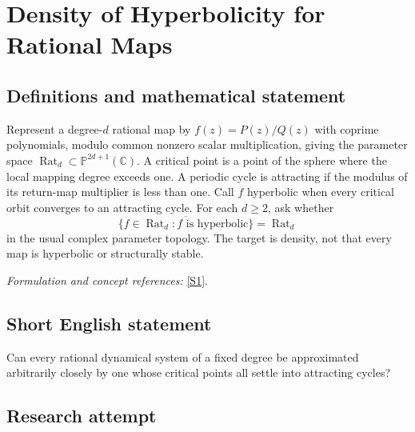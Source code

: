 \documentclass[11pt,a4paper]{article}
\newcommand{\C}{\mathbb{C}}
\newcommand{\PP}{\mathbb P}
\newcommand{\sref}[2]{\hyperlink{source:#1:#2}{[S#2]}}
\newif\ifshowcatalogue
\newcommand{\cataloguescope}[1]{\ifshowcatalogue
 \paragraph{Exact scope in the supplied catalogue.}
 \begin{quote}\small #1\end{quote}\fi}
\numberwithin{equation}{section}
\begin{document}
\setcounter{section}{0}
\clearpage
\section*{\texorpdfstring{Density of Hyperbolicity for Rational Maps}{Density of Hyperbolicity for Rational Maps}}\label{30006757}
\subsection{Definitions and mathematical statement}
Represent a degree-$d$ rational map by $f(z)=P(z)/Q(z)$ with coprime polynomials, modulo common nonzero scalar multiplication, giving the parameter space $\operatorname{Rat}_d\subset\PP^{2d+1}(\C)$. A critical point is a point of the sphere where the local mapping degree exceeds one. A periodic cycle is attracting if the modulus of its return-map multiplier is less than one. Call $f$ hyperbolic when every critical orbit converges to an attracting cycle. For each $d\ge2$, ask whether
\[
 \overline{\{f\in\operatorname{Rat}_d:f\text{ is hyperbolic}\}}=\operatorname{Rat}_d
\]
in the usual complex parameter topology. The target is density, not that every map is hyperbolic or structurally stable.
\par\smallskip\textit{Formulation and concept references:} \sref{30006757}{1}.
\cataloguescope{Determine whether hyperbolic rational maps, whose critical points are all attracted to attracting periodic cycles, are dense in the space of rational maps of the Riemann sphere of each fixed degree d >= 2.}
\subsection{Short English statement}
Can every rational dynamical system of a fixed degree be approximated arbitrarily closely by one whose critical points all settle into attracting cycles?
\subsection{Research attempt}
\end{document}
